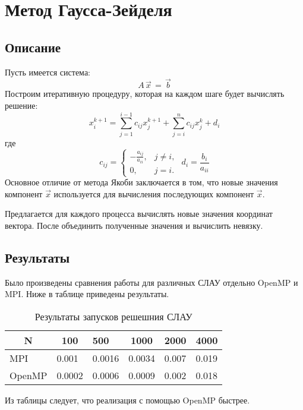 \section{Метод Гаусса-Зейделя}
\subsection{Описание}
Пусть имеется система:
\begin{equation*}
  A \, \vec{x} \, = \, \vec{b}
\end{equation*}
Построим итеративную процедуру, которая на каждом шаге будет вычислять решение:
\begin{equation*}
  x_i^{k + 1} = \sum_{j=1}^{i - 1} c_{ij}x_{j}^{k+1} + \sum_{j=i}^{n} c_{ij}x_{j}^{k} + d_i
\end{equation*}
где
\begin{equation*}
  c_{ij} =
  \left\{
  \begin{matrix}
  - \frac{a_{ij}}{a_{ii}}, & j \neq i, \\
  0, & j = i.
  \end{matrix} \right. \, \,
  d_i = \frac{b_i}{a_{ii}}
\end{equation*}
Основное отличие от метода Якоби заключается в том, что новые значения компонент $\vec{x}$ используется
для вычисления последующих компонент $\vec{x}$.

Предлагается для каждого процесса вычислять новые значения координат вектора. После объединить полученные значения и вычислить невязку.

\subsection{Результаты}
Было произведены сравнения работы для различных СЛАУ отдельно OpenMP и MPI. Ниже в таблице приведены результаты.

\begin{table}[!h]
\centering
\begin{tabular}{|l|l|l|l|l|l|}
\hline
\multicolumn{1}{|c|}{N} & \multicolumn{1}{c|}{100} & 500    & \multicolumn{1}{c|}{1000} & \multicolumn{1}{c|}{2000} & 4000  \\ \hline
MPI                     & 0.001                    & 0.0016 & 0.0034                    & 0.007                     & 0.019 \\ \hline
OpenMP                  & 0.0002                   & 0.0006 & 0.0009                    & 0.002                     & 0.018 \\ \hline
\end{tabular}
\caption{Результаты запусков решешния СЛАУ}
\end{table}

Из таблицы следует, что реализация с помощью OpenMP быстрее.
